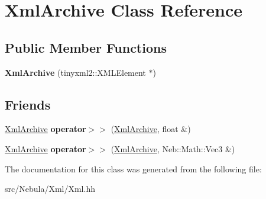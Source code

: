 \hypertarget{classXmlArchive}{\section{Xml\-Archive Class Reference}
\label{classXmlArchive}
}
\subsection*{Public Member Functions}
\begin{DoxyCompactItemize}
\item 
\hypertarget{classXmlArchive_af60507762c0e126c686ba370b502c519}{{\bfseries Xml\-Archive} (tinyxml2\-::\-X\-M\-L\-Element $\ast$)}\label{classXmlArchive_af60507762c0e126c686ba370b502c519}

\end{DoxyCompactItemize}
\subsection*{Friends}
\begin{DoxyCompactItemize}
\item 
\hypertarget{classXmlArchive_ac00483f1bd65b3d880d13399bdf383a1}{\hyperlink{classXmlArchive}{Xml\-Archive} {\bfseries operator$>$$>$} (\hyperlink{classXmlArchive}{Xml\-Archive}, float \&)}\label{classXmlArchive_ac00483f1bd65b3d880d13399bdf383a1}

\item 
\hypertarget{classXmlArchive_ada2eb5f73207ee6133a5f6876c0bbe79}{\hyperlink{classXmlArchive}{Xml\-Archive} {\bfseries operator$>$$>$} (\hyperlink{classXmlArchive}{Xml\-Archive}, Neb\-::\-Math\-::\-Vec3 \&)}\label{classXmlArchive_ada2eb5f73207ee6133a5f6876c0bbe79}

\end{DoxyCompactItemize}


The documentation for this class was generated from the following file\-:\begin{DoxyCompactItemize}
\item 
src/\-Nebula/\-Xml/Xml.\-hh\end{DoxyCompactItemize}
